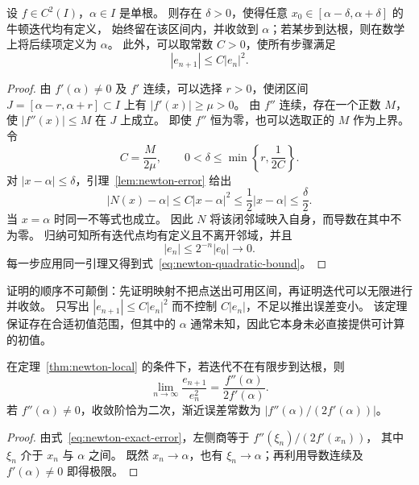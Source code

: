 \documentclass{ctexart}
\begin{document}
\begin{theorem}[局部收敛]\label{thm:newton-local}
设 $f\in C^2(I)$，$\alpha\in I$ 是单根。
则存在 $\delta>0$，使得任意 $x_0\in[\alpha-\delta,\alpha+\delta]$ 的牛顿迭代均有定义，
始终留在该区间内，并收敛到 $\alpha$；若某步到达根，则在数学上将后续项定义为 $\alpha$。
此外，可以取常数 $C>0$，使所有步骤满足
\begin{equation}\label{eq:newton-quadratic-bound}
  |e_{n+1}|\le C|e_n|^2.
\end{equation}
\end{theorem}

\begin{proof}
由 $f'(\alpha)\ne0$ 及 $f'$ 连续，可以选择 $r>0$，使闭区间
$J=[\alpha-r,\alpha+r]\subset I$ 上有 $|f'(x)|\ge\mu>0$。
由 $f''$ 连续，存在一个正数 $M$，使 $|f''(x)|\le M$ 在 $J$ 上成立。
即使 $f''$ 恒为零，也可以选取正的 $M$ 作为上界。令
\[
  C=\frac{M}{2\mu},\qquad
  0<\delta\le\min\left\{r,\frac{1}{2C}\right\}.
\]
对 $|x-\alpha|\le\delta$，引理~\ref{lem:newton-error} 给出
\[
  |N(x)-\alpha|\le C|x-\alpha|^2
     \le\frac12|x-\alpha|\le\frac\delta2.
\]
当 $x=\alpha$ 时同一不等式也成立。
因此 $N$ 将该闭邻域映入自身，而导数在其中不为零。
归纳可知所有迭代点均有定义且不离开邻域，并且
\[
  |e_n|\le2^{-n}|e_0|\longrightarrow0.
\]
每一步应用同一引理又得到式~\eqref{eq:newton-quadratic-bound}。
\end{proof}

证明的顺序不可颠倒：先证明映射不把点送出可用区间，再证明迭代可以无限进行并收敛。
只写出 $|e_{n+1}|\le C|e_n|^2$ 而不控制 $C|e_n|$，不足以推出误差变小。
该定理保证存在合适初值范围，但其中的 $\alpha$ 通常未知，因此它本身未必直接提供可计算的初值。

\begin{corollary}[渐近误差常数]\label{cor:newton-asymptotic}
在定理~\ref{thm:newton-local} 的条件下，若迭代不在有限步到达根，则
\begin{equation}\label{eq:newton-asymptotic}
  \lim_{n\to\infty}\frac{e_{n+1}}{e_n^2}
    =\frac{f''(\alpha)}{2f'(\alpha)}.
\end{equation}
若 $f''(\alpha)\ne0$，收敛阶恰为二次，渐近误差常数为
$|f''(\alpha)/(2f'(\alpha))|$。
\end{corollary}

\begin{proof}
由式~\eqref{eq:newton-exact-error}，左侧商等于 $f''(\xi_n)/(2f'(x_n))$，
其中 $\xi_n$ 介于 $x_n$ 与 $\alpha$ 之间。
既然 $x_n\to\alpha$，也有 $\xi_n\to\alpha$；再利用导数连续及 $f'(\alpha)\ne0$ 即得极限。
\end{proof}
\end{document}
